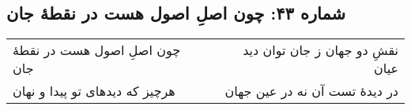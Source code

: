 \begin{center}
\section*{شماره ۴۳: چون اصلِ اصول هست در نقطۀ جان}
\label{sec:043}
\begin{longtable}{l p{0.5cm} r}
چون اصلِ اصول هست در نقطهٔ جان
&&
نقشِ دو جهان ز جان توان دید عیان
\\
هرچیز که دیدهای تو پیدا و نهان
&&
در دیدهٔ تست آن نه در عین جهان
\\
\end{longtable}
\end{center}
